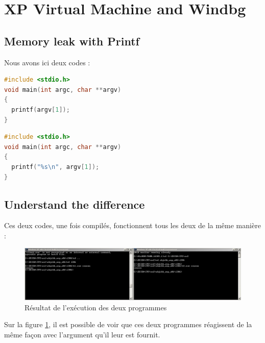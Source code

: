 \section{XP Virtual Machine and Windbg}
\subsection{Memory leak with Printf}
Nous avons ici deux codes :\\
\begin{center}
\begin{lstlisting}[language=C, caption=Premier programme]
#include <stdio.h>
void main(int argc, char **argv)
{
  printf(argv[1]);
}
\end{lstlisting}
\begin{lstlisting}[language=C, caption=Second programme]
#include <stdio.h>
void main(int argc, char **argv)
{
  printf("%s\n", argv[1]);
}
\end{lstlisting}
\end{center}
\subsection{Understand the difference}
Ces deux codes, une fois compilés, fonctionnent tous les deux de la même manière :
\begin{figure}[H]
  \centering
  \includegraphics[width=.9\textwidth]{img/200.JPG}
  \caption{Résultat de l'exécution des deux programmes}
  \label{img:1}
\end{figure}

Sur la figure \ref{img:1}, il est possible de voir que ces deux programmes réagissent de la même façon avec l'argument qu'il leur est fournit.
